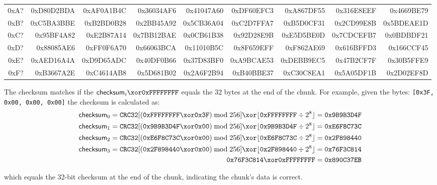 \begin{table}[h]
{\begin{tabular}{|r||r|r|r|r|r|r|r|r|}
0xA? &
0xD80D2BDA &  0xAF0A1B4C &  0x36034AF6 &  0x41047A60 &  0xDF60EFC3 &  0xA867DF55 &  0x316E8EEF &  0x4669BE79 \\
0xB? &
0xC5BA3BBE &  0xB2BD0B28 &  0x2BB45A92 &  0x5CB36A04 &  0xC2D7FFA7 &  0xB5D0CF31 &  0x2CD99E8B &  0x5BDEAE1D \\
0xC? &
0x95BF4A82 &  0xE2B87A14 &  0x7BB12BAE &  0x0CB61B38 &  0x92D28E9B &  0xE5D5BE0D &  0x7CDCEFB7 &  0x0BDBDF21 \\
0xD? &
0x88085AE6 &  0xFF0F6A70 &  0x66063BCA &  0x11010B5C &  0x8F659EFF &  0xF862AE69 &  0x616BFFD3 &  0x166CCF45 \\
0xE? &
0xAED16A4A &  0xD9D65ADC &  0x40DF0B66 &  0x37D83BF0 &  0xA9BCAE53 &  0xDEBB9EC5 &  0x47B2CF7F &  0x30B5FFE9 \\
0xF? &
0xB3667A2E &  0xC4614AB8 &  0x5D681B02 &  0x2A6F2B94 &  0xB40BBE37 &  0xC30C8EA1 &  0x5A05DF1B &  0x2D02EF8D \\
\hline
\end{tabular}
}
\end{table}
\par
\noindent
The checksum matches if the $\textsf{checksum}_i \xor \texttt{0xFFFFFFFF}$
equals the 32 bytes at the end of the chunk.
For example, given the bytes: \texttt{[0x3F, 0x00, 0x00, 0x00]}
the checksum is calculated as:
{
  \begin{align*}
    \textsf{checksum}_0 = \texttt{CRC32}[(\texttt{0xFFFFFFFF} \xor \texttt{0x3F}) \bmod 256] \xor \lfloor\texttt{0xFFFFFFFF} \div 2 ^ 8\rfloor &= \texttt{0x9B9B3D4F} \\
    \textsf{checksum}_1 = \texttt{CRC32}[(\texttt{0x9B9B3D4F} \xor \texttt{0x00}) \bmod 256] \xor \lfloor\texttt{0x9B9B3D4F} \div 2 ^ 8\rfloor &= \texttt{0xE6F8C73C} \\
    \textsf{checksum}_2 = \texttt{CRC32}[(\texttt{0xE6F8C73C} \xor \texttt{0x00}) \bmod 256] \xor \lfloor\texttt{0xE6F8C73C} \div 2 ^ 8\rfloor &= \texttt{0x2F898440} \\
    \textsf{checksum}_3 = \texttt{CRC32}[(\texttt{0x2F898440} \xor \texttt{0x00}) \bmod 256] \xor \lfloor\texttt{0x2F898440} \div 2 ^ 8\rfloor &= \texttt{0x76F3C814} \\
    \texttt{0x76F3C814} \xor \texttt{0xFFFFFFFF} &= \texttt{0x890C37EB} \\
  \end{align*}
}
\par
\noindent
which equals the 32-bit checksum at the end of the chunk,
indicating the chunk's data is correct.
